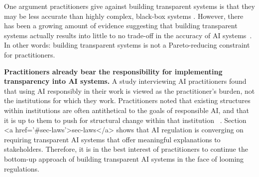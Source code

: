 One argument practitioners give against building transparent systems is that they may be less accurate than highly complex, black-box systems \cite{huysmans2006using}. However, there has been a growing amount of evidence suggesting that building transparent systems actually results into little to no trade-off in the accuracy of AI systems~\cite{rudin2019stop, bell2019proactive, stiglic2015comprehensible, de2018predicting}. In other words: building transparent systems is not a Pareto-reducing constraint for practitioners.

{\bf Practitioners already bear the responsibility for implementing transparency into AI systems.} A study interviewing AI practitioners found that using AI responsibly in their work is viewed as the practitioner’s burden, not the institutions for which they work. Practitioners noted that existing structures within institutions are often antithetical to the goals of responsible AI, and that it is up to them to push for structural change within that institution ~\cite{rakova2020responsible}. Section <a href='#sec-laws'>sec-laws</a> shows that AI regulation is converging on requiring transparent AI systems that offer meaningful explanations to stakeholders. Therefore, it is in the best interest of practitioners to continue the bottom-up approach of building transparent AI systems in the face of looming regulations.